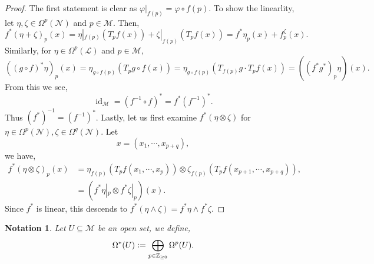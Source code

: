 \documentclass[8pt]{article}
\newtheorem{notation}{Notation}[section]
\DeclareMathOperator{\id}{id}
\newcommand{\defeq}{\vcentcolon=}
\newcommand{\Z}[0]{\mathbb{Z}}
\newcommand{\M}[0]{\mathcal{M}}
\newcommand{\maniN}[0]{\mathcal{N}}
\begin{document}
\begin{proof}
  The first statement is clear as $\varphi|_{f(p)} = \varphi\circ f(p)$. To show the linearlity, let $\eta,\zeta\in\Omega^p(\maniN)$ and $p\in\M$. Then,
  \begin{equation*}
    f^*(\eta+\zeta)_p(x) = \eta|_{f(p)}(T_pf(x))+\zeta|_{f(p)}(T_pf(x)) = f^*\eta_p(x)+f^\zeta_p(x).
  \end{equation*} 
  Similarly, for $\eta\in\Omega^p(\mathcal{L})$ and $p\in\M$, 
  \begin{equation*}
    ((g\circ f)^*\eta)_p(x) = \eta_{g\circ f(p)}(T_pg\circ f(x)) = \eta_{g\circ f(p)}(T_{f(p)}g\cdot T_p f(x)) = ((f^*g^*)_p\eta)(x).
  \end{equation*}
  From this we see,
  \begin{equation*}
    \id_\M = (f^{-1}\circ f)^* = f^*(f^{-1})^*.
  \end{equation*}
  Thus $(f^*)^{-1} = (f^{-1})^*$. Lastly, let us first examine $f^*(\eta\otimes \zeta)$ for $\eta\in\Omega^p(\maniN),\zeta\in\Omega^q(\maniN)$. Let 
  \begin{equation*}
    x = (x_1,\cdots,x_{p+q}),
  \end{equation*}
  we have,
  \begin{align*}
    f^*(\eta\otimes\zeta)_p(x) &= \eta_{f(p)}(T_pf(x_1,\cdots,x_p))\otimes \zeta_{f(p)}(T_pf(x_{p+1},\cdots,x_{p+q})),\\
    & = (f^*\eta|_p\otimes f^*\zeta|_p)(x).
  \end{align*}
  Since $f^*$ is linear, this descends to $f^*(\eta\wedge\zeta) = f^*\eta\wedge f^*\zeta$.
\end{proof}

\begin{notation}Let $U\subseteq\M$ be an open set, we define,
  \begin{equation*}
    \Omega^*(U) \defeq \bigoplus_{p\in\Z_{\geq0}}\Omega^p(U).
  \end{equation*}
\end{notation}
\end{document}
